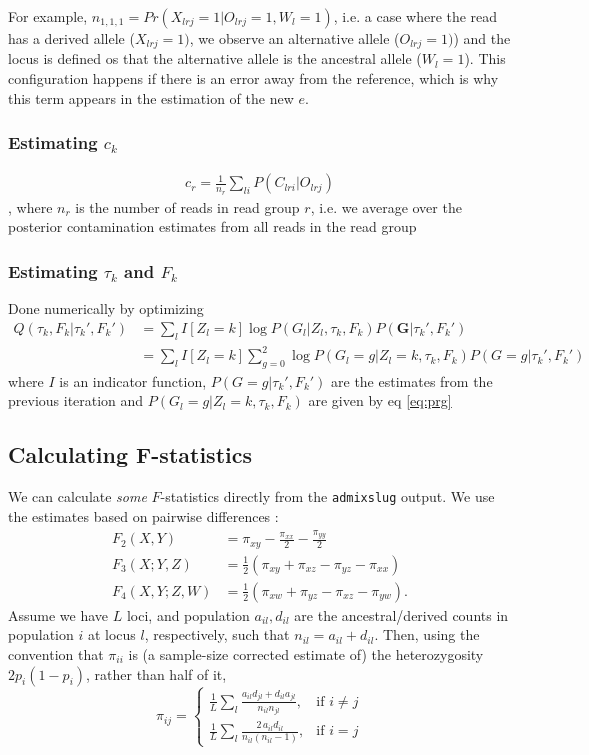 \documentclass[10pt,a4paper]{article}
\begin{document}
For example, $n_{1,1,1} = Pr(X_{lrj}=1|O_{lrj}=1, W_l=1)$, i.e. a case where the read has a derived allele ($X_{lrj}=1)$, we observe an alternative allele ($O_{lrj}=1)$) and the locus is defined os that the alternative allele is the ancestral allele ($W_l=1$). This configuration happens if there is an error away from the reference, which is why this term appears in the estimation of the new $e$.

\subsubsection*{Estimating $c_k$}
\begin{align*}
c_r =  \frac{1}{n_r}\sum_{li} P(C_{lri}| O_{lrj})
\end{align*},
where $n_r$ is the number of reads in read group $r$, i.e. we average over the posterior contamination estimates from all reads in the read group
\subsubsection*{Estimating $\tau_k$ and $F_k$}
Done numerically by optimizing
\begin{align*}
Q(\tau_k, F_k | \tau_k', F_k') 
&= \sum_{l} I[Z_l=k] \log P( G_l | Z_l, \tau_k, F_k) P(\mathbf{G} | \tau_k', F_k') \\
&= \sum_{l} I[Z_l=k]\sum_{g=0}^2 \log P( G_l=g | Z_l=k, \tau_k, F_k)P(G=g | \tau_k', F_k')
\end{align*}
where $I$ is an indicator function, $P(G=g | \tau_k', F_k')$ are the estimates from the previous iteration and $ P( G_l=g | Z_l=k, \tau_k, F_k)$ are given by eq \ref{eq:prg}

\subsection*{Calculating F-statistics}
We can calculate \emph{some} $F$-statistics directly from the \texttt{admixslug} output. We use the estimates based on pairwise differences \citep{peter2016}:
\begin{align}
F_2(X, Y) &= \pi_{xy} -\frac{\pi_{xx}}{2} - \frac{\pi_{yy}}{2}\\
F_3(X; Y, Z) &= \frac{1}{2}\left(\pi_{xy} +\pi_{xz} - \pi_{yz} - \pi_{xx}\right)\\
F_4(X, Y; Z, W) &= \frac{1}{2}\left(\pi_{xw} +\pi_{yz} - \pi_{xz} - \pi_{yw}\right).
\end{align}
Assume we have $L$ loci, and population $a_{il}, d_{il}$ are the ancestral/derived counts in population $i$ at locus $l$, respectively, such that $n_{il} = a_{il} + d_{il}$. Then, using the convention that $\pi_{ii}$ is (a sample-size corrected estimate of) the heterozygosity $2p_i(1-p_i)$, rather than half of it,
\begin{equation}
\pi_{ij} = \begin{cases}
\frac{1}{L}\sum_l \frac{a_{il}d_{jl} + d_{il}a_{jl}} {n_{il}n_{jl}} ,& \text{if } i \neq j\\
\frac{1}{L}\sum_l \frac{2\, a_{il}d_{il}}{n_{il}(n_{il} -1)},              & \text{if }i =j
\end{cases}
\end{equation}
\end{document}
